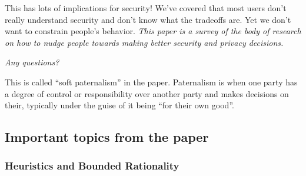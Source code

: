 \documentclass[11pt]{article}
\begin{document}
This has lots of implications for security! We've covered that most users don't really understand security and don't know what the tradeoffs are. Yet we don't want to constrain people's behavior. {\it This paper is a survey of the body of research on how to nudge people towards making better security and privacy decisions.}

{\it Any questions?}

This is called ``soft paternalism'' in the paper. Paternalism is when one party has a degree of control or responsibility over another party and makes decisions on their, typically under the guise of it being ``for their own good''.

\subsection{Important topics from the paper}
\subsubsection{Heuristics and Bounded Rationality}
\end{document}
